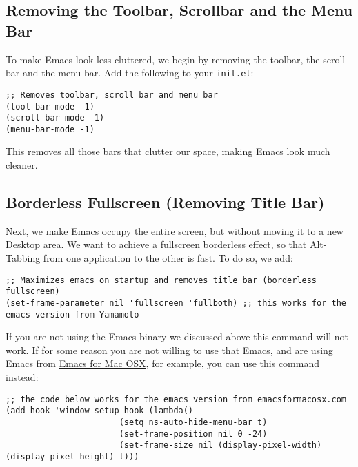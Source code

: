 \documentclass[12pt, a4paper]{article}
\begin{document}
\subsection{Removing the Toolbar, Scrollbar and the Menu Bar}
\label{sec:orgecdd7ca}

To make Emacs look less cluttered, we begin by removing the toolbar, the scroll bar and the menu bar. Add the following to your \texttt{init.el}:

\lstset{language=Lisp,label= ,caption= ,captionpos=b,numbers=none}
\begin{lstlisting}
;; Removes toolbar, scroll bar and menu bar
(tool-bar-mode -1)
(scroll-bar-mode -1)
(menu-bar-mode -1)
\end{lstlisting}

This removes all those bars that clutter our space, making Emacs look much cleaner.

\subsection{Borderless Fullscreen (Removing Title Bar)}
\label{sec:org90f9c0e}

Next, we make Emacs occupy the entire screen, but without moving it to a new Desktop area. We want to achieve a fullscreen borderless effect, so that Alt-Tabbing from one application to the other is fast. To do so, we add:

\lstset{language=Lisp,label= ,caption= ,captionpos=b,numbers=none}
\begin{lstlisting}
;; Maximizes emacs on startup and removes title bar (borderless fullscreen)
(set-frame-parameter nil 'fullscreen 'fullboth) ;; this works for the emacs version from Yamamoto
\end{lstlisting}

If you are not using the Emacs binary we discussed above this command will not work. If for some reason you are not willing to use that Emacs, and are using Emacs from \href{https://emacsformacosx.com}{Emacs for Mac OSX}, for example, you can use this command instead:

\lstset{language=Lisp,label= ,caption= ,captionpos=b,numbers=none}
\begin{lstlisting}
;; the code below works for the emacs version from emacsformacosx.com
(add-hook 'window-setup-hook (lambda()
                       (setq ns-auto-hide-menu-bar t)
                       (set-frame-position nil 0 -24)
                       (set-frame-size nil (display-pixel-width) (display-pixel-height) t)))
\end{lstlisting}
\end{document}
